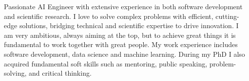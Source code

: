 Passionate AI Engineer with extensive experience in both software development and scientific research. I love to solve complex problems with efficient, cutting-edge solutions, bridging technical and scientific expertise to drive innovation.
I am very ambitious, always aiming at the top, but to achieve great things it is fundamental to work together with great people.
My work experience includes software development, data science and machine learning. During my PhD I also acquired fundamental soft skills such as mentoring, public speaking, problem-solving, and critical thinking.